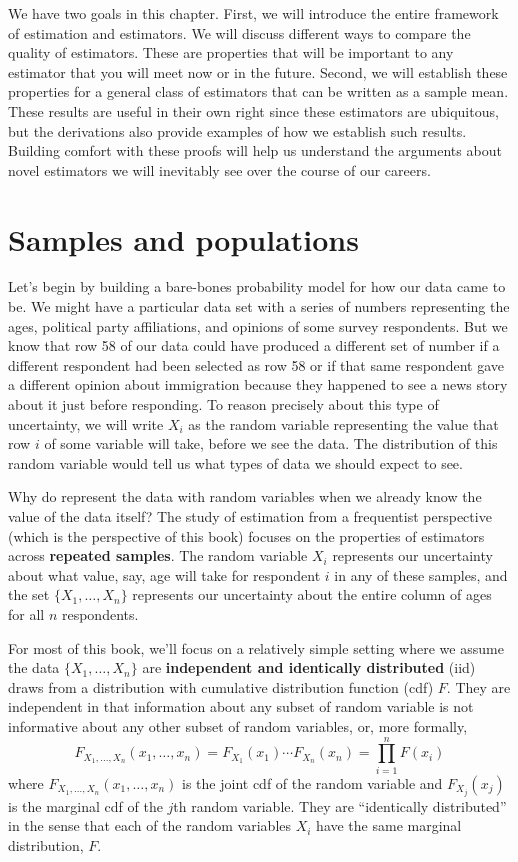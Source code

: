 \documentclass[
  letterpaper,
  DIV=11,
  numbers=noendperiod]{scrreprt}
\theoremstyle{definition}
\theoremstyle{plain}
\theoremstyle{definition}
\theoremstyle{remark}
\begin{document}
We have two goals in this chapter. First, we will introduce the entire
framework of estimation and estimators. We will discuss different ways
to compare the quality of estimators. These are properties that will be
important to any estimator that you will meet now or in the future.
Second, we will establish these properties for a general class of
estimators that can be written as a sample mean. These results are
useful in their own right since these estimators are ubiquitous, but the
derivations also provide examples of how we establish such results.
Building comfort with these proofs will help us understand the arguments
about novel estimators we will inevitably see over the course of our
careers.

\hypertarget{samples-and-populations}{%
\section{Samples and populations}\label{samples-and-populations}}

Let's begin by building a bare-bones probability model for how our data
came to be. We might have a particular data set with a series of numbers
representing the ages, political party affiliations, and opinions of
some survey respondents. But we know that row 58 of our data could have
produced a different set of number if a different respondent had been
selected as row 58 or if that same respondent gave a different opinion
about immigration because they happened to see a news story about it
just before responding. To reason precisely about this type of
uncertainty, we will write \(X_i\) as the random variable representing
the value that row \(i\) of some variable will take, before we see the
data. The distribution of this random variable would tell us what types
of data we should expect to see.

Why do represent the data with random variables when we already know the
value of the data itself? The study of estimation from a frequentist
perspective (which is the perspective of this book) focuses on the
properties of estimators across \textbf{repeated samples}. The random
variable \(X_i\) represents our uncertainty about what value, say, age
will take for respondent \(i\) in any of these samples, and the set
\(\{X_{1}, \ldots, X_{n}\}\) represents our uncertainty about the entire
column of ages for all \(n\) respondents.

For most of this book, we'll focus on a relatively simple setting where
we assume the data \(\{X_1, \ldots, X_n\}\) are \textbf{independent and
identically distributed} (iid) draws from a distribution with cumulative
distribution function (cdf) \(F\). They are independent in that
information about any subset of random variable is not informative about
any other subset of random variables, or, more formally, \[
F_{X_{1},\ldots,X_{n}}(x_{1}, \ldots, x_{n}) = F_{X_{1}}(x_{1})\cdots F_{X_{n}}(x_{n}) = \prod_{i=1}^n F(x_i)
\] where \(F_{X_{1},\ldots,X_{n}}(x_{1}, \ldots, x_{n})\) is the joint
cdf of the random variable and \(F_{X_{j}}(x_{j})\) is the marginal cdf
of the \(j\)th random variable. They are ``identically distributed'' in
the sense that each of the random variables \(X_i\) have the same
marginal distribution, \(F\).
\end{document}
